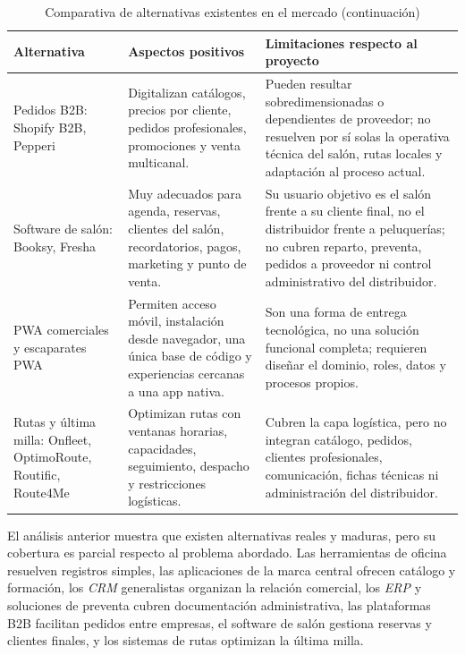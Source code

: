 {\begin{table}[H]
\centering
\ContinuedFloat
\caption[]{Comparativa de alternativas existentes en el mercado (continuación)}
\begin{tabularx}{\textwidth}{>{\RaggedRight\arraybackslash}p{}>{\RaggedRight\arraybackslash}p{}>{\RaggedRight\arraybackslash}p{}}
\hline
\textbf{Alternativa} & \textbf{Aspectos positivos} & \textbf{Limitaciones respecto al proyecto} \\
\hline
Pedidos B2B: Shopify B2B, Pepperi & Digitalizan catálogos, precios por cliente, pedidos profesionales, promociones y venta multicanal. & Pueden resultar sobredimensionadas o dependientes de proveedor; no resuelven por sí solas la operativa técnica del salón, rutas locales y adaptación al proceso actual. \\
\hline
Software de salón: Booksy, Fresha & Muy adecuados para agenda, reservas, clientes del salón, recordatorios, pagos, marketing y punto de venta. & Su usuario objetivo es el salón frente a su cliente final, no el distribuidor frente a peluquerías; no cubren reparto, preventa, pedidos a proveedor ni control administrativo del distribuidor. \\
\hline
PWA comerciales y escaparates PWA & Permiten acceso móvil, instalación desde navegador, una única base de código y experiencias cercanas a una app nativa. & Son una forma de entrega tecnológica, no una solución funcional completa; requieren diseñar el dominio, roles, datos y procesos propios. \\
\hline
Rutas y última milla: Onfleet, OptimoRoute, Routific, Route4Me & Optimizan rutas con ventanas horarias, capacidades, seguimiento, despacho y restricciones logísticas. & Cubren la capa logística, pero no integran catálogo, pedidos, clientes profesionales, comunicación, fichas técnicas ni administración del distribuidor. \\
\hline
\end{tabularx}
\end{table}
}

El análisis anterior muestra que existen alternativas reales y maduras, pero su cobertura es parcial respecto al problema abordado. Las herramientas de oficina resuelven registros simples, las aplicaciones de la marca central ofrecen catálogo y formación, los \textit{CRM} generalistas organizan la relación comercial, los \textit{ERP} y soluciones de preventa cubren documentación administrativa, las plataformas B2B facilitan pedidos entre empresas, el software de salón gestiona reservas y clientes finales, y los sistemas de rutas optimizan la última milla.

